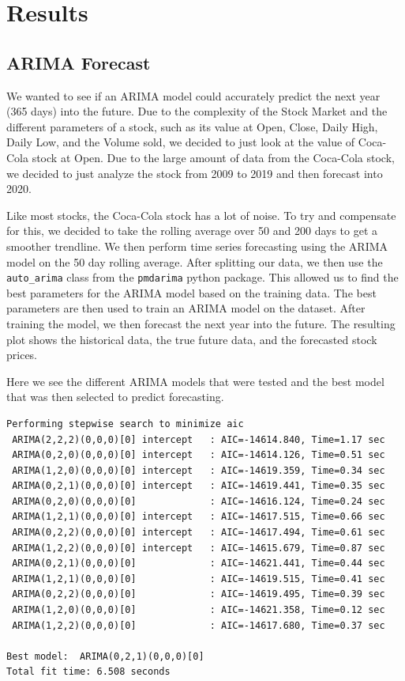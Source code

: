 \documentclass[12pt]{article}
\begin{document}
\section{Results}

\subsection{ARIMA Forecast}

We wanted to see if an ARIMA model could accurately predict the next year (365 days) into the future. 
Due to the complexity of the Stock Market and the different parameters of a stock, such as its value 
at Open, Close, Daily High, Daily Low, and the Volume sold, we decided to just look at the value of 
Coca-Cola stock at Open. Due to the large amount of data from the Coca-Cola stock, we decided to just 
analyze the stock from 2009 to 2019 and then forecast into 2020.\par

Like most stocks, the Coca-Cola stock has a lot of noise. To try and compensate for this, we decided 
to take the rolling average over 50 and 200 days to get a smoother trendline. We then perform time series 
forecasting using the ARIMA model on the 50 day rolling average. After splitting our data, we then use the 
\texttt{auto\_arima} class from the \texttt{pmdarima} python package. This allowed us to find the best parameters 
for the ARIMA model based on the training data. The best parameters are then used to train an ARIMA model on the 
dataset. After training the model, we then forecast the next year into the future. The resulting plot shows the historical 
data, the true future data, and the forecasted stock prices.\par

Here we see the different ARIMA models that were tested and the best model that was then selected to predict forecasting.

\begin{verbatim}
Performing stepwise search to minimize aic
 ARIMA(2,2,2)(0,0,0)[0] intercept   : AIC=-14614.840, Time=1.17 sec
 ARIMA(0,2,0)(0,0,0)[0] intercept   : AIC=-14614.126, Time=0.51 sec
 ARIMA(1,2,0)(0,0,0)[0] intercept   : AIC=-14619.359, Time=0.34 sec
 ARIMA(0,2,1)(0,0,0)[0] intercept   : AIC=-14619.441, Time=0.35 sec
 ARIMA(0,2,0)(0,0,0)[0]             : AIC=-14616.124, Time=0.24 sec
 ARIMA(1,2,1)(0,0,0)[0] intercept   : AIC=-14617.515, Time=0.66 sec
 ARIMA(0,2,2)(0,0,0)[0] intercept   : AIC=-14617.494, Time=0.61 sec
 ARIMA(1,2,2)(0,0,0)[0] intercept   : AIC=-14615.679, Time=0.87 sec
 ARIMA(0,2,1)(0,0,0)[0]             : AIC=-14621.441, Time=0.44 sec
 ARIMA(1,2,1)(0,0,0)[0]             : AIC=-14619.515, Time=0.41 sec
 ARIMA(0,2,2)(0,0,0)[0]             : AIC=-14619.495, Time=0.39 sec
 ARIMA(1,2,0)(0,0,0)[0]             : AIC=-14621.358, Time=0.12 sec
 ARIMA(1,2,2)(0,0,0)[0]             : AIC=-14617.680, Time=0.37 sec

Best model:  ARIMA(0,2,1)(0,0,0)[0]          
Total fit time: 6.508 seconds
\end{verbatim}
\end{document}
